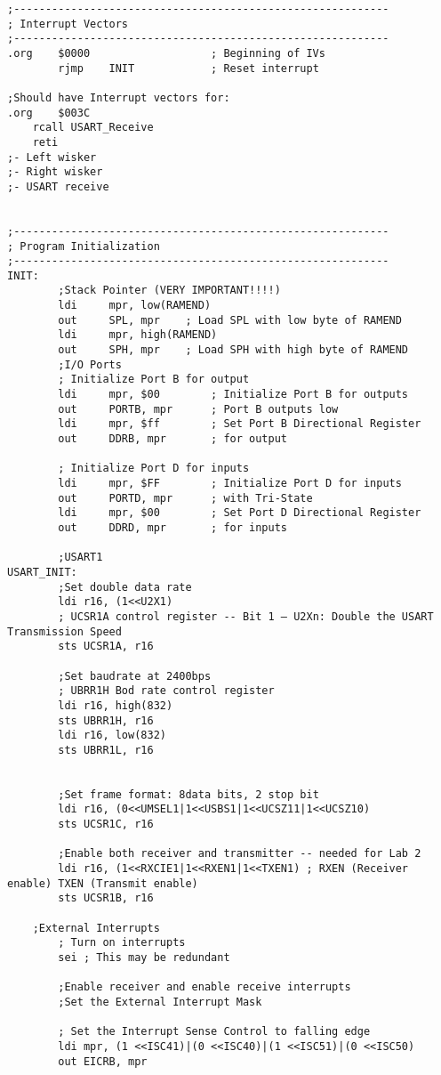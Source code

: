\documentclass[12pt,letterpaper]{article}
\begin{document}
\begin{verbatim}
;-----------------------------------------------------------
; Interrupt Vectors
;-----------------------------------------------------------
.org	$0000					; Beginning of IVs
		rjmp 	INIT			; Reset interrupt

;Should have Interrupt vectors for:
.org    $003C
    rcall USART_Receive
    reti
;- Left wisker
;- Right wisker
;- USART receive


;-----------------------------------------------------------
; Program Initialization
;-----------------------------------------------------------
INIT:
        ;Stack Pointer (VERY IMPORTANT!!!!)
        ldi     mpr, low(RAMEND)
        out     SPL, mpr    ; Load SPL with low byte of RAMEND
        ldi     mpr, high(RAMEND)
        out     SPH, mpr    ; Load SPH with high byte of RAMEND
        ;I/O Ports
        ; Initialize Port B for output
        ldi     mpr, $00        ; Initialize Port B for outputs
        out     PORTB, mpr      ; Port B outputs low
        ldi     mpr, $ff        ; Set Port B Directional Register
        out     DDRB, mpr       ; for output

        ; Initialize Port D for inputs
        ldi     mpr, $FF        ; Initialize Port D for inputs
        out     PORTD, mpr      ; with Tri-State
        ldi     mpr, $00        ; Set Port D Directional Register
        out     DDRD, mpr       ; for inputs

        ;USART1
USART_INIT:
        ;Set double data rate
        ldi r16, (1<<U2X1)
        ; UCSR1A control register -- Bit 1 – U2Xn: Double the USART Transmission Speed
        sts UCSR1A, r16

        ;Set baudrate at 2400bps
        ; UBRR1H Bod rate control register
        ldi r16, high(832)
        sts UBRR1H, r16
        ldi r16, low(832)
        sts UBRR1L, r16


		;Set frame format: 8data bits, 2 stop bit
        ldi r16, (0<<UMSEL1|1<<USBS1|1<<UCSZ11|1<<UCSZ10)
        sts UCSR1C, r16

        ;Enable both receiver and transmitter -- needed for Lab 2
        ldi r16, (1<<RXCIE1|1<<RXEN1|1<<TXEN1) ; RXEN (Receiver enable) TXEN (Transmit enable)
        sts UCSR1B, r16

	;External Interrupts
        ; Turn on interrupts
        sei ; This may be redundant

		;Enable receiver and enable receive interrupts
		;Set the External Interrupt Mask

        ; Set the Interrupt Sense Control to falling edge
        ldi mpr, (1 <<ISC41)|(0 <<ISC40)|(1 <<ISC51)|(0 <<ISC50)
        out EICRB, mpr


\end{verbatim}
\end{document}
